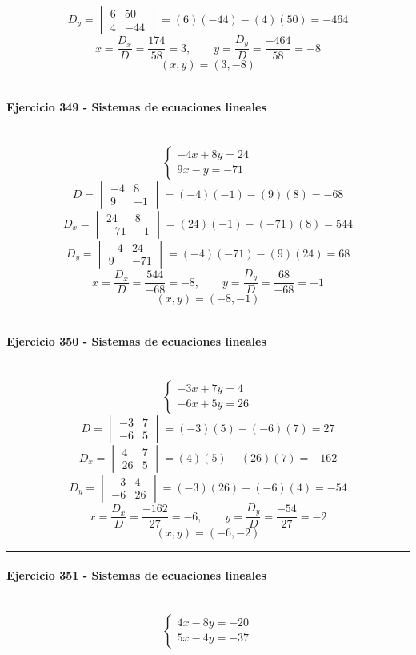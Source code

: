 \documentclass[10pt,a4paper]{article}
\newcommand{\res}[1]{\paragraph{#1}\mbox{}\\[-1.2em]}
\begin{document}
\[ D_y=\begin{vmatrix}6&50\\4&-44\end{vmatrix}=(6)(-44)-(4)(50)=-464 \]
\[ x=\frac{D_x}{D}=\frac{174}{58}=3,\qquad y=\frac{D_y}{D}=\frac{-464}{58}=-8 \]
\[ \boxed{(x,y)=(3,-8)} \]
\vspace{1mm}\hrule\vspace{2mm}
\res{Ejercicio 349 - Sistemas de ecuaciones lineales}
\[ \begin{cases}- 4 x + 8 y=24\\9 x - y=-71\end{cases} \]
\[ D=\begin{vmatrix}-4&8\\9&-1\end{vmatrix}=(-4)(-1)-(9)(8)=-68 \]
\[ D_x=\begin{vmatrix}24&8\\-71&-1\end{vmatrix}=(24)(-1)-(-71)(8)=544 \]
\[ D_y=\begin{vmatrix}-4&24\\9&-71\end{vmatrix}=(-4)(-71)-(9)(24)=68 \]
\[ x=\frac{D_x}{D}=\frac{544}{-68}=-8,\qquad y=\frac{D_y}{D}=\frac{68}{-68}=-1 \]
\[ \boxed{(x,y)=(-8,-1)} \]
\vspace{1mm}\hrule\vspace{2mm}
\res{Ejercicio 350 - Sistemas de ecuaciones lineales}
\[ \begin{cases}- 3 x + 7 y=4\\- 6 x + 5 y=26\end{cases} \]
\[ D=\begin{vmatrix}-3&7\\-6&5\end{vmatrix}=(-3)(5)-(-6)(7)=27 \]
\[ D_x=\begin{vmatrix}4&7\\26&5\end{vmatrix}=(4)(5)-(26)(7)=-162 \]
\[ D_y=\begin{vmatrix}-3&4\\-6&26\end{vmatrix}=(-3)(26)-(-6)(4)=-54 \]
\[ x=\frac{D_x}{D}=\frac{-162}{27}=-6,\qquad y=\frac{D_y}{D}=\frac{-54}{27}=-2 \]
\[ \boxed{(x,y)=(-6,-2)} \]
\vspace{1mm}\hrule\vspace{2mm}
\res{Ejercicio 351 - Sistemas de ecuaciones lineales}
\[ \begin{cases}4 x - 8 y=-20\\5 x - 4 y=-37\end{cases} \]
\end{document}
